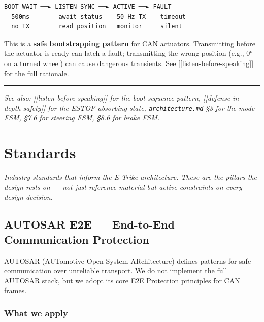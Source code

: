 \documentclass[12pt,a4paper,oneside]{report}
\begin{document}
\begin{verbatim}
BOOT_WAIT ──► LISTEN_SYNC ──► ACTIVE ──► FAULT
  500ms        await status    50 Hz TX    timeout
  no TX        read position   monitor     silent
\end{verbatim}

This is a \textbf{safe bootstrapping pattern} for CAN actuators. Transmitting
before the actuator is ready can latch a fault; transmitting the wrong position
(e.g., 0° on a turned wheel) can cause dangerous transients. See
{[}{[}listen-before-speaking{]}{]} for the full rationale.

\begin{center}\rule{0.5\linewidth}{0.5pt}\end{center}

\emph{See also: {[}{[}listen-before-speaking{]}{]} for the boot sequence
pattern, {[}{[}defense-in-depth-safety{]}{]} for the ESTOP absorbing state,
\texttt{architecture.md} §3 for the mode FSM, §7.6 for steering FSM, §8.6 for
brake FSM.}



\part{Standards}
\label{part:standards}

\textit{Industry standards that inform the E-Trike architecture. These are the pillars the design rests on --- not just reference material but active constraints on every design decision.}

\chapter{AUTOSAR E2E --- End-to-End Communication
Protection}\label{autosar-e2e-end-to-end-communication-protection}

AUTOSAR (AUTomotive Open System ARchitecture) defines patterns for safe
communication over unreliable transport. We do not implement the full AUTOSAR
stack, but we adopt its core E2E Protection principles for CAN frames.

\section{What we apply}\label{what-we-apply}
\end{document}

